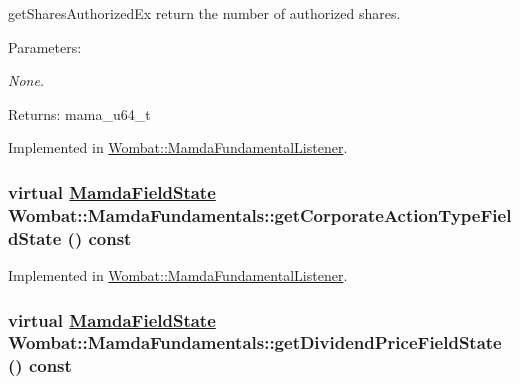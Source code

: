 get\-Shares\-Authorized\-Ex return the number of authorized shares. 

\begin{Desc}
\item[Parameters:]
\begin{description}
\item[{\em None.}]\end{description}
\end{Desc}
\begin{Desc}
\item[Returns:]mama\_\-u64\_\-t \end{Desc}


Implemented in \hyperlink{classWombat_1_1MamdaFundamentalListener_338972a5c68467e1464b62b59ef19af7}{Wombat::Mamda\-Fundamental\-Listener}.\hypertarget{classWombat_1_1MamdaFundamentals_73d57275845df72b4c389c7081e7170d}{
\subsubsection[getCorporateActionTypeFieldState]{\setlength{\rightskip}{0pt plus 5cm}virtual \hyperlink{namespaceWombat_93aac974f2ab713554fd12a1fa3b7d2a}{Mamda\-Field\-State} Wombat::Mamda\-Fundamentals::get\-Corporate\-Action\-Type\-Field\-State () const}}
\label{classWombat_1_1MamdaFundamentals_73d57275845df72b4c389c7081e7170d}




Implemented in \hyperlink{classWombat_1_1MamdaFundamentalListener_990406da217bef790753e65c47d558df}{Wombat::Mamda\-Fundamental\-Listener}.\hypertarget{classWombat_1_1MamdaFundamentals_adfde192656e67be8ce319914e87b29a}{
\subsubsection[getDividendPriceFieldState]{\setlength{\rightskip}{0pt plus 5cm}virtual \hyperlink{namespaceWombat_93aac974f2ab713554fd12a1fa3b7d2a}{Mamda\-Field\-State} Wombat::Mamda\-Fundamentals::get\-Dividend\-Price\-Field\-State () const}}
\label{classWombat_1_1MamdaFundamentals_adfde192656e67be8ce319914e87b29a}




